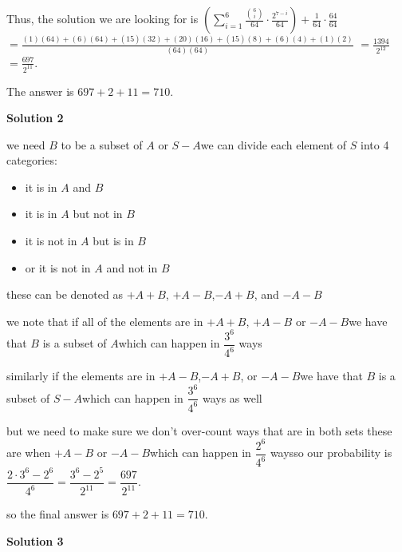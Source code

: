 \begin{enumerate}
 Thus, the solution we are looking for is $\left(\sum_{i=1}^6 \frac{{6\choose i}}{64} \cdot \frac{2^{7-i}}{64}\right) + \frac{1}{64} \cdot \frac{64}{64}$ $=\frac{(1)(64)+(6)(64)+(15)(32)+(20)(16)+(15)(8)+(6)(4)+(1)(2)}{(64)(64)}$ $=\frac{1394}{2^{12}}$$=\frac{697}{2^{11}}$.

 The answer is $697 + 2 + 11 = 710$.

 



\textbf{Solution 2}

we need $B$ to be a subset of $A$ or $S-A$we can divide each element of $S$ into 4 categories:

 
            \begin{itemize}
        \item it is in $A$ and $B$
        \item it is in $A$ but not in $B$
        \item it is not in $A$ but is in $B$
        \item or it is not in $A$ and not in $B$
            \end{itemize}
            these can be denoted as $+A+B$, $+A-B$,$-A+B$, and $-A-B$

 we note that if all of the elements are in $+A+B$, $+A-B$ or $-A-B$we have that $B$ is a subset of $A$which can happen in $\dfrac{3^6}{4^6}$ ways

 similarly if the elements are in $+A-B$,$-A+B$, or $-A-B$we have  that $B$ is a subset of $S-A$which can happen in $\dfrac{3^6}{4^6}$ ways as well

 but we need to make sure we don't over-count ways that are in both sets these are when $+A-B$ or $-A-B$which can happen in $\dfrac{2^6}{4^6}$ waysso our probability is $\dfrac{2\cdot 3^6-2^6}{4^6}= \dfrac{3^6-2^5}{2^{11}}=\dfrac{697}{2^{11}}$.

 so the final answer is $697 + 2 + 11 = 710$.

 



\textbf{Solution 3}


\end{enumerate}
